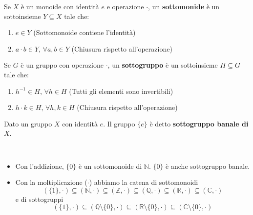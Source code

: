 \documentclass[../main.tex]{subfiles}
\begin{document}
\begin{definition}[Sottomonoide]
    Se  $X$ è un monoide con identità $e$ e operazione $\cdot$, un \textbf{sottomonide} è un sottoinsieme $Y \subseteq X$ tale che:
    \begin{enumerate}
        \item $e \in Y$ (Sottomonoide contiene l'identità)
        \item $a\cdot b \in Y$, $\forall a,b \in Y$ (Chiusura rispetto all'operazione)
    \end{enumerate}
\end{definition}

\begin{definition}[Sottogruppo]
    Se $G$ è un gruppo con operazione $\cdot$, un \textbf{sottogruppo} è un sottoinsieme $H \subseteq G$ tale che:
    \begin{enumerate}
        \item $h^{-1} \in H$, $\forall h \in H$ (Tutti gli elementi sono invertibili)
        \item $h \cdot k \in H$, $\forall h,k \in H$ (Chiusura rispetto all'operazione)
    \end{enumerate}

    \begin{note}
        Dato un gruppo $X$ con identità $e$. Il gruppo $\{e\}$ è detto \textbf{sottogruppo banale di $X$}.
    \end{note}
\end{definition}

\begin{example}
    \
    \begin{itemize}
        \item Con l'addizione, $\{0\}$ è un sottomonoide di $\mathbb{N}$. $\{0\}$ è anche sottogruppo banale.
        \item Con la moltiplicazione ($\cdot$) abbiamo la catena di sottomonoidi
              \[
                  (\{1\}, \cdot ) \subseteq (\mathbb{N}, \cdot ) \subseteq ( \mathbb{Z}, \cdot ) \subseteq (\mathbb{Q}, \cdot ) \subseteq (\mathbb{R}, \cdot ) \subseteq ( \mathbb{C}, \cdot )
              \]
              e di sottogruppi
              \[
                  (\{1\}, \cdot ) \subseteq (\mathbb{Q}\setminus \{0\}, \cdot ) \subseteq (\mathbb{R} \setminus \{0\}, \cdot ) \subseteq (\mathbb{C}\setminus \{0\}, \cdot )
              \]
    \end{itemize}
\end{example}
\end{document}
